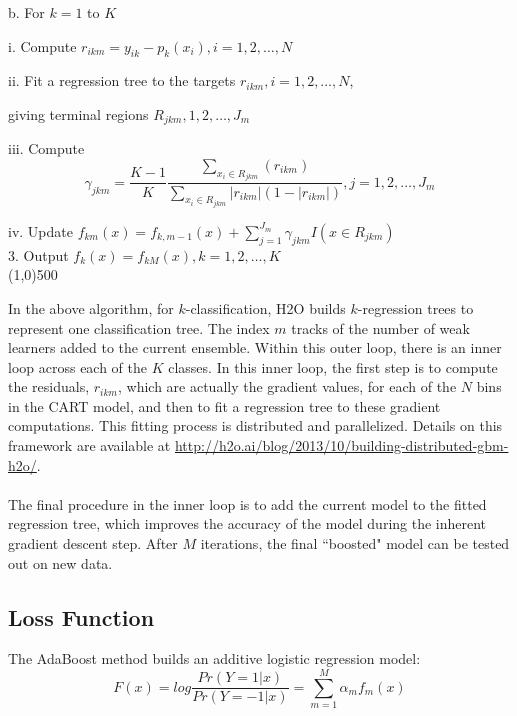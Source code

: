 \hspace{1cm} b. For $k=1$ to $K$

\hspace{2cm} i. Compute $r_{ikm} = y_{ik} - p_k(x_i),  i = 1,2,\dots,N$

\hspace{2cm} ii. Fit a regression tree to the targets $r_{ikm}, i = 1,2,\dots,N$,
\par \hspace{2.5cm} giving terminal regions $R_{jkm}, 1,2,\dots,J_m$

\hspace{2cm}iii. Compute $$\gamma_{jkm} = \frac{K-1}{K} \frac{\sum_{x_i \in R_{jkm}} (r_{ikm})}{\sum_{x_i \in R_{jkm}} |r_{ikm}| (1 - |r_{ikm}|)} , j=1,2,\dots,J_m$$

\hspace{2cm} iv. Update $f_{km}(x) = f_{k,m-1}(x) + \sum_{j=1}^{J_m} \gamma_{jkm} I(x \in R_{jkm})$
\\
3. Output $f_k^{\hat{}}(x) = f_{kM}(x),  k=1,2,\dots,K$
\\
\line(1,0){500}



In the above algorithm, for $k$-classification, H2O builds $k$-regression trees to represent one classification tree. The index $m$ tracks of the number of weak learners added to the current ensemble. Within this outer loop, there is an inner loop across each of the $K$ classes. In this inner loop, the first step is to compute the residuals, $r_{ikm}$, which are actually the gradient values, for each of the $N$ bins in the CART model, and then to fit a regression tree to these gradient computations. This fitting process is distributed and parallelized. Details on this framework are available at {\url{http://h2o.ai/blog/2013/10/building-distributed-gbm-h2o/}}.
\\
\\
The final procedure in the inner loop is to add the current model to the fitted regression tree, which improves the accuracy of the model during the inherent gradient descent step. After $M$ iterations, the final ``boosted" model can be tested out on new data.

\subsection{Loss Function}
The AdaBoost method builds an additive logistic regression model:
$${F(x) = log}\frac{Pr(Y = 1|x)}{Pr(Y = -1|x)} = \sum_{m=1}^{M} \alpha_m f_m (x) $$

